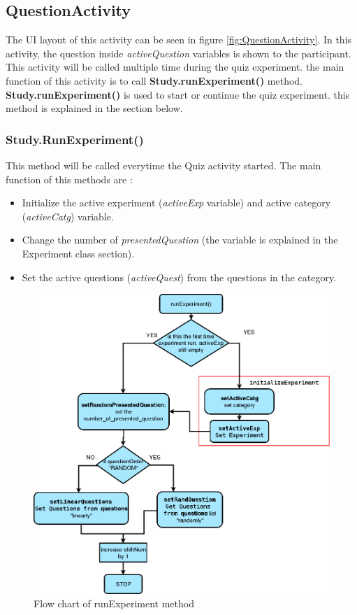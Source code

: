\subsection{QuestionActivity}
The UI layout of this activity can be seen in figure \ref{fig:QuestionActivity}.
In this activity, the question inside \textit{activeQuestion} variables is shown to the participant.
This activity will be called multiple time during the quiz experiment.
the main function of this activity is to call \textbf{Study.runExperiment()} method.
\textbf{Study.runExperiment()} is used to start or continue the quiz experiment.
this method is explained in the section below.

\subsubsection{Study.RunExperiment()}
This method will be called everytime the Quiz activity started.
The main function of this methods are :
\begin{itemize}
\item Initialize the active experiment (\textit{activeExp} variable) and active category (\textit{activeCatg}) variable.
\item Change the number of \textit{presentedQuestion} (the variable is explained in the Experiment class section).
\item Set the active questions (\textit{activeQuest}) from the questions in the category.
\end{itemize}


\begin{figure}
\begin{center}
\includegraphics[scale=0.45]{runExperiment}
\end{center}
\caption{Flow chart of runExperiment method}
\label{fig:runExperiment_flow}
\end{figure}


